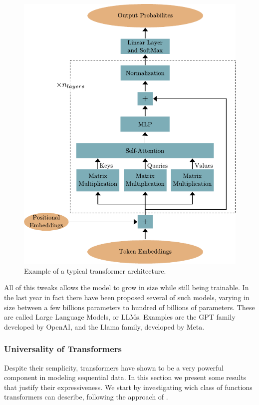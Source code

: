 \documentclass[]{marticle}
\begin{document}
\begin{figure}[!tb] 
\begin{center}
\includegraphics{transformer_architecture.pdf}
\caption{Example of a typical transformer architecture.} 
\label{fig:transformer-architecture} 
\end{center}
\end{figure}

All of this tweaks allows the model to grow in size while still being trainable. In the last year in
fact there have been proposed several of such models, varying in size between a few billions
parameters to hundred of billions of parameters. These are called Large Language Models, or LLMs.
Examples are the GPT family developed by OpenAI, and the Llama family, developed by Meta.

\subsubsection{Universality of Transformers}

Despite their semplicity, transformers have shown to be a very powerful component in modeling
sequential data. In this section we present some results that justify their expressiveness. We start
by investigating wich class of functions transformers can describe, following the approach of
\cite{transformer-approx}.
\end{document}
